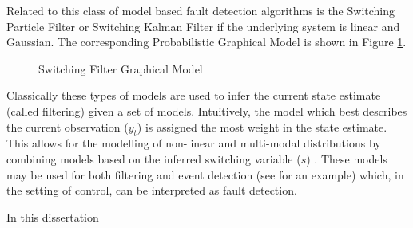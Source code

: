 Related to this class of model based fault detection algorithms is the Switching Particle Filter or Switching Kalman Filter if the underlying system is linear and Gaussian. The corresponding Probabilistic Graphical Model is shown in Figure \ref{fig_spf_skf}.
\begin{figure}[H] 
\centering
{}
\caption{Switching Filter Graphical Model}
\label{fig_spf_skf}
\end{figure}
Classically these types of models are used to infer the current state  estimate (called filtering) given a set of models. Intuitively, the model which best describes the current observation ($y_t$) is assigned the most weight in the state estimate. This allows for the modelling of non-linear and multi-modal distributions by combining models based on the inferred switching variable ($s$) \cite{murphy1}. These models may be used for both filtering and event detection (see \cite{veerar} for an example) which, in the setting of control, can be interpreted as fault detection.

In this dissertation 






